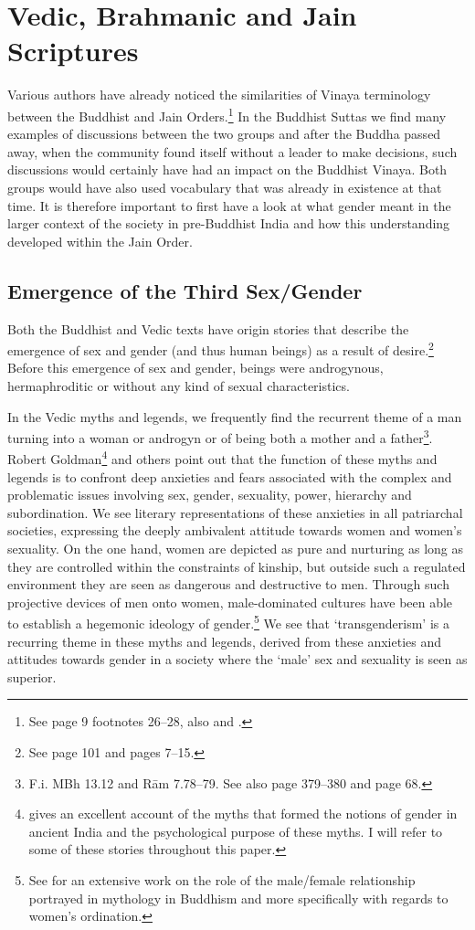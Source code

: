 \section{Vedic, Brahmanic and Jain Scriptures}

Various authors have already noticed the similarities of Vinaya terminology between the Buddhist and Jain Orders.\footnote{See \cite{maes2016} page 9 footnotes 26–28, also \cite{sujato2009} and \cite{zwilling}.} In the Buddhist Suttas we find many examples of discussions between the two groups and after the Buddha passed away, when the community found itself without a leader to make decisions, such discussions would certainly have had an impact on the Buddhist Vinaya. Both groups would have also used vocabulary that was already in existence at that time. It is therefore important to first have a look at what gender meant in the larger context of the society in pre-Buddhist India and how this understanding developed within the Jain Order.

\subsection{Emergence of the Third Sex/Gender}
Both the Buddhist and Vedic texts have origin stories that describe the emergence of sex and gender (and thus human beings) as a result of desire.\footnote{See \cite{zwilling2000} page 101 and \cite{artinger} pages 7–15.} Before this emergence of sex and gender, beings were androgynous, hermaphroditic or without any kind of sexual characteristics.

In the Vedic myths and legends, we frequently find the recurrent theme of a man turning into a woman or androgyn or of being both a mother and a father\footnote{F.i. MBh 13.12 and Rām 7.78–79. See also \cite{goldman} page 379–380 and \cite{cassell} page 68.}. Robert Goldman\footnote{\cite{goldman} gives an excellent account of the myths that formed the notions of gender in ancient India and the psychological purpose of these myths. I will refer to some of these stories throughout this paper.} and others point out that the function of these myths and legends is to confront deep anxieties and fears associated with the complex and problematic issues involving sex, gender, sexuality, power, hierarchy and subordination. We see literary representations of these anxieties in all patriarchal societies, expressing the deeply ambivalent attitude towards women and women's sexuality. On the one hand, women are depicted as pure and nurturing as long as they are controlled within the constraints of kinship, but outside such a regulated environment they are seen as dangerous and destructive to men. Through such projective devices of men onto women, male-dominated cultures have been able to establish a hegemonic ideology of gender.\footnote{See \cite{sujato2011} for an extensive work on the role of the male/female relationship portrayed in mythology in Buddhism and more specifically with regards to women's ordination.} We see that `transgenderism' is a recurring theme in these myths and legends, derived from these anxieties and attitudes towards gender in a society where the `male' sex and sexuality is seen as superior.

